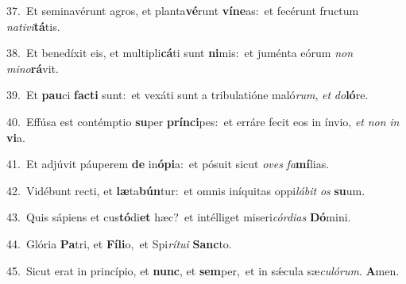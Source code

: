 {\numbfont\textcolor{\numbcolor}{37.}}~Et seminavérunt agros, et planta\-\textbf{vé}\-runt \textbf{ví}\-\textbf{ne}as:~\star et fecérunt fructum \textit{na}\-\textit{ti}\textit{vi}\textbf{tá}tis.\par
{\numbfont\textcolor{\numbcolor}{38.}}~Et benedíxit eis, et multipli\-\textbf{cá}\-ti sunt \textbf{ni}\-mis:~\star et juménta eórum \textit{non} \textit{mi}\-\textit{no}\textbf{rá}vit.\par
{\numbfont\textcolor{\numbcolor}{39.}}~Et \textbf{pau}\-ci \textbf{fac}\-\textbf{ti} sunt:~\star et vexáti sunt a tribulatióne maló\-\textit{rum}\-, \textit{et} \textit{do}\-\textbf{ló}re.\par
{\numbfont\textcolor{\numbcolor}{40.}}~Effúsa est contémptio \textbf{su}\-per \textbf{prín}\-\textbf{ci}pes:~\star et erráre fecit eos in ínvio, \textit{et} \textit{non} \textit{in} \textbf{vi}\-a.\par
{\numbfont\textcolor{\numbcolor}{41.}}~Et adjúvit páuperem \textbf{de} in\-\textbf{ó}\-\textbf{pi}a:~\star et pósuit sicut \textit{o}\-\textit{ves} \textit{fa}\-\textbf{mí}lias.\par
{\numbfont\textcolor{\numbcolor}{42.}}~Vidébunt recti, et \textbf{læ}\-ta\-\textbf{bún}\-tur:~\star et omnis iníquitas oppi\-\textit{lá}\-\textit{bit} \textit{os} \textbf{su}\-um.\par
{\numbfont\textcolor{\numbcolor}{43.}}~Quis sápiens et cus\-\textbf{tó}\-di\textbf{et} hæc?~\star et intélliget miseri\-\textit{cór}\-\textit{di}\textit{as} \textbf{Dó}\-mini.\par
{\numbfont\textcolor{\numbcolor}{44.}}~Glória \textbf{Pa}\-tri, et \textbf{Fí}\-\textbf{li}o,~\star et Spi\-\textit{rí}\-\textit{tu}\textit{i} \textbf{Sanc}\-to.\par
{\numbfont\textcolor{\numbcolor}{45.}}~Sicut erat in princípio, et \textbf{nunc}\-, et \textbf{sem}\-per,~\star et in sǽcula sæ\-\textit{cu}\-\textit{ló}\textit{rum}. \textbf{A}\-men.\par
